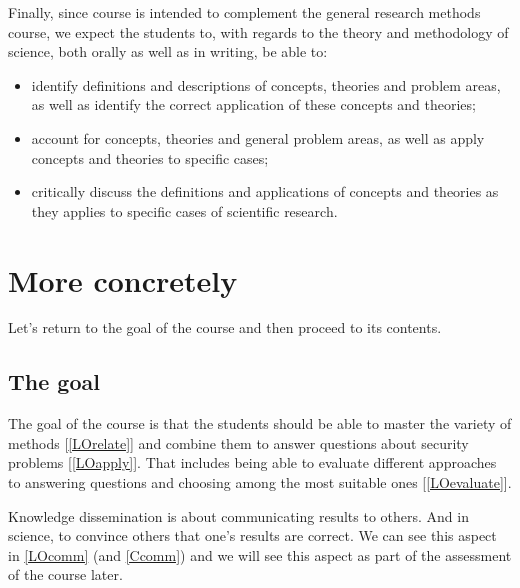 Finally, since course is intended to complement the general research methods 
course, we expect the students to, with regards to the theory and  methodology 
of science, both orally as well as in writing, be able to:
\begin{itemize}
  \item identify definitions and descriptions of concepts, theories and problem 
    areas, as well as identify the correct application of these concepts and 
    theories;
  \item account for concepts, theories and general problem areas, as well as 
    apply concepts and theories to specific cases;
  \item critically discuss the definitions and applications of concepts and 
    theories as they applies to specific cases of scientific research.
\end{itemize}


\section{More concretely}

Let's return to the goal of the course and then proceed to its contents.

\subsection{The goal}

The goal of the course is that the students should be able to master the 
variety of methods [\ref{LOrelate}] and combine them to answer questions about 
security problems [\ref{LOapply}].
That includes being able to evaluate different approaches to answering 
questions and choosing among the most suitable ones [\ref{LOevaluate}].

Knowledge dissemination is about communicating results to others.
And in science, to convince others that one's results are correct.
We can see this aspect in \ref{LOcomm} (and \ref{Ccomm}) and we will see this 
aspect as part of the assessment of the course later.

